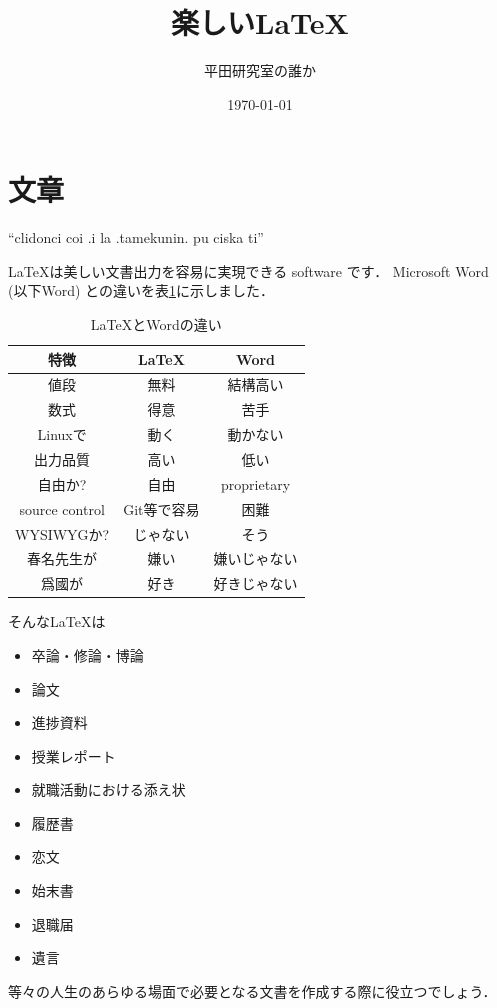 \documentclass[a4j, dvipdfmx]{jsarticle}
\title{楽しい\LaTeX}
\author{平田研究室の誰か}
\date{\today}
\begin{document}
\maketitle
\section{文章}
  ``clidonci coi .i la .tamekunin. pu ciska ti''
  \par \LaTeX は美しい文書出力を容易に実現できる software です．
  Microsoft Word (以下Word) との違いを表\ref{tbl_latexVsWord}に示しました．
    \begin{table}[b]
      \center
      \caption{\LaTeX とWordの違い} \label{tbl_latexVsWord}
      \begin{tabular}{c||c|c}
        特徴 & \LaTeX & Word \\ \hline
        値段 & 無料 & 結構高い \\
        数式 & 得意 & 苦手 \\
        Linuxで & 動く & 動かない \\
        出力品質 & 高い & 低い \\
        自由か? & 自由 & proprietary \\
        source control & Git等で容易 & 困難 \\
        WYSIWYGか? & じゃない & そう \\
        春名先生が & 嫌い & 嫌いじゃない \\
        爲國が & 好き & 好きじゃない
      \end{tabular}
    \end{table}
  そんな\LaTeX は
    \begin{itemize}
      \item 卒論・修論・博論
      \item 論文
      \item 進捗資料
      \item 授業レポート
      \item 就職活動における添え状
      \item 履歴書
      \item 恋文
      \item 始末書
      \item 退職届
      \item 遺言
    \end{itemize}
  等々の人生のあらゆる場面で必要となる文書を作成する際に役立つでしょう．
\end{document}
